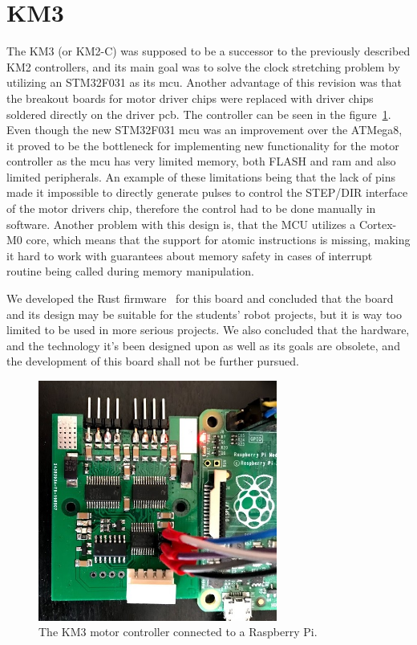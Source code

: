 \section{KM3}
\label{sec:km3}
The KM3 (or KM2-C) was supposed to be a successor to the previously described KM2 controllers, and its main goal was to solve the clock stretching problem by utilizing an STM32F031 as its \acs{mcu}.
Another advantage of this revision was that the breakout boards for motor driver chips were replaced with driver chips soldered directly on the driver \acs{pcb}.
The controller can be seen in the figure~\ref{fig:km3}.
Even though the new STM32F031 \acs{mcu} was an improvement over the ATMega8, it proved to be the bottleneck for implementing new functionality for the motor controller as the \acs{mcu} has very limited memory, both FLASH and \acs{ram} and also limited peripherals.
An example of these limitations being that the lack of pins made it impossible to directly generate pulses to control the STEP/DIR interface of the motor drivers chip, therefore the control had to be done manually in software.
Another problem with this design is, that the MCU utilizes a Cortex-M0 core, which means that the support for atomic instructions is missing, making it hard to work with guarantees about memory safety in cases of interrupt routine being called during memory manipulation.

We developed the Rust firmware~\cite{hybl_robotics-butkm3-rs_2020} for this board and concluded that the board and its design may be suitable for the students' robot projects, but it is way too limited to be used in more serious projects.
We also concluded that the hardware, and the technology it's been designed upon as well as its goals are obsolete, and the development of this board shall not be further pursued.

\begin{figure}[H]
    \centering
    \includegraphics[width=0.7\textwidth]{obrazky/km3}
    \caption{The KM3 motor controller connected to a Raspberry Pi.}
    \label{fig:km3}
\end{figure}

